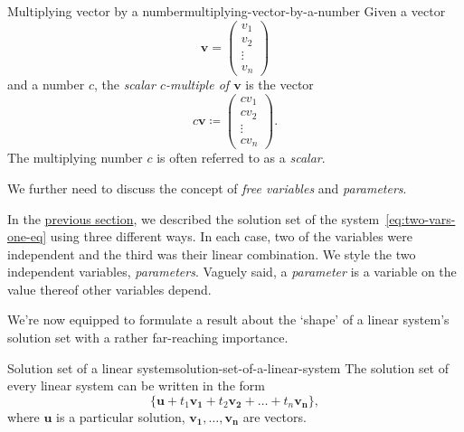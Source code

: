 \begin{definition}{Multiplying vector by a number}{multiplying-vector-by-a-number}
 Given a vector
 \[
  \mathbf{v} = 
  \begin{pmatrix}
   v_1\\
   v_2\\
   \vdots\\
   v_n
  \end{pmatrix}
 \]
 and a number $c$, the \emph{scalar $c$-multiple of $\mathbf{v}$} is the vector
 \[
  c \mathbf{v} \coloneqq 
  \begin{pmatrix}
   cv_1\\
   cv_2\\
   \vdots\\
   cv_n
  \end{pmatrix}.
 \]
 The multiplying number $c$ is often referred to as a \emph{scalar}.
\end{definition}

We further need to discuss the concept of \emph{free variables} and
\emph{parameters}.

In the \hyperref[sec:visualization]{previous section}, we described the solution
set of the system~\eqref{eq:two-vars-one-eq} using three different ways. In each
case, two of the variables were independent and the third was their linear
combination. We style the two independent variables, \emph{parameters}. Vaguely
said, a \emph{parameter} is a variable on the value thereof other variables
depend. 

We're now equipped to formulate a result about the `shape' of a linear system's
solution set with a rather far-reaching importance.

\begin{theorem}{Solution set of a linear system}{solution-set-of-a-linear-system}
 The solution set of every linear system can be written in the form
 \[
  \{\mathbf{u} + t_1 \mathbf{v_1} + t_2 \mathbf{v_2} + \ldots +
  t_n\mathbf{v_n}\},
 \]
 where $\mathbf{u}$ is a particular solution, $\mathbf{v_1},\ldots,\mathbf{v_n}$
 are vectors.
\end{theorem}

